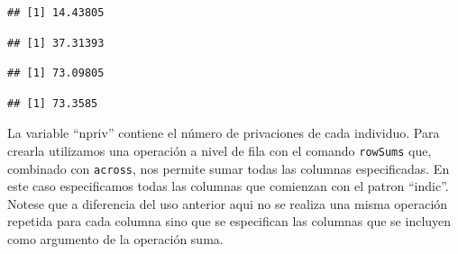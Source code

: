 \documentclass[
]{book}
\newenvironment{Shaded}{\begin{snugshade}}{\end{snugshade}}
\newcommand{\AttributeTok}[1]{\textcolor[rgb]{0.77,0.63,0.00}{#1}}
\newcommand{\ConstantTok}[1]{\textcolor[rgb]{0.00,0.00,0.00}{#1}}
\newcommand{\DecValTok}[1]{\textcolor[rgb]{0.00,0.00,0.81}{#1}}
\newcommand{\FunctionTok}[1]{\textcolor[rgb]{0.00,0.00,0.00}{#1}}
\newcommand{\NormalTok}[1]{#1}
\newcommand{\SpecialCharTok}[1]{\textcolor[rgb]{0.00,0.00,0.00}{#1}}
\begin{document}
\begin{Shaded}
\end{Shaded}

\begin{verbatim}
## [1] 14.43805
\end{verbatim}

\begin{Shaded}
\end{Shaded}

\begin{verbatim}
## [1] 37.31393
\end{verbatim}

\begin{Shaded}
\end{Shaded}

\begin{verbatim}
## [1] 73.09805
\end{verbatim}

\begin{Shaded}
\end{Shaded}

\begin{verbatim}
## [1] 73.3585
\end{verbatim}

La variable ``npriv'' contiene el número de privaciones de cada individuo. Para crearla utilizamos una operación a nivel de fila con el comando \texttt{rowSums} que, combinado con \texttt{across}, nos permite sumar todas las columnas especificadas. En este caso especificamos todas las columnas que comienzan con el patron ``indic''. Notese que a diferencia del uso anterior aqui no se realiza una misma operación repetida para cada columna sino que se especifican las columnas que se incluyen como argumento de la operación suma.
\end{document}
